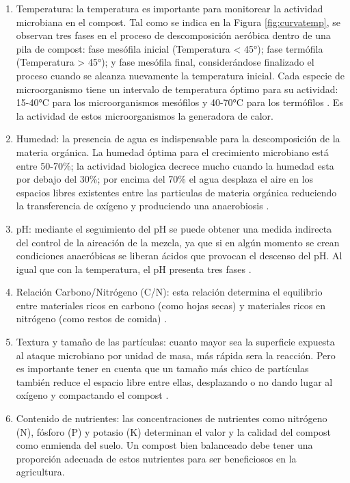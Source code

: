  \begin{enumerate}
	\item Temperatura: la temperatura es importante para monitorear la actividad microbiana en el compost. Tal como se indica en la Figura \ref{fig:curvatemp}\citep{curvaTemp}, se observan tres fases en el proceso de descomposición aeróbica dentro de una pila de compost: fase mesófila inicial (Temperatura < 45°); fase termófila (Temperatura > 45°); y fase mesófila final, considerándose finalizado el proceso cuando se alcanza nuevamente la temperatura inicial.
    Cada especie de microorganismo tiene un intervalo de temperatura óptimo para su actividad: 15-40°C para los microorganismos mesófilos y 40-70°C para los termófilos \citep{FactoresCompost}. Es la actividad de estos microorganismos la generadora de calor.
    \item Humedad: la presencia de agua es indispensable para la descomposición de la materia orgánica. La humedad óptima para el crecimiento microbiano está entre 50-70\%; la actividad biologica decrece mucho cuando la humedad esta por debajo del 30\%; por encima del 70\% el agua desplaza el aire en los espacios libres existentes entre las particulas de materia orgánica reduciendo la transferencia de oxígeno y produciendo una anaerobiosis \citep{Compost}.
    \item pH: mediante el seguimiento del pH se puede obtener una medida indirecta del control de la aireación de la mezcla, ya que si en algún momento se crean condiciones anaeróbicas se liberan ácidos que provocan el descenso del pH. Al igual que con la temperatura, el pH presenta tres fases \citep{FactoresCompost}.
    \item Relación Carbono/Nitrógeno (C/N): esta relación determina el equilibrio entre materiales ricos en carbono (como hojas secas) y materiales ricos en nitrógeno (como restos de comida) \citep{FactoresCompost}.
    \item Textura y tamaño de las partículas: cuanto mayor sea la superficie expuesta al ataque microbiano por unidad de masa, más rápida sera la reacción. Pero es importante tener en cuenta que un tamaño más chico de partículas también reduce  el espacio libre entre ellas, desplazando o no dando lugar al oxígeno y compactando el compost \citep{ManualBuenasPracticas}.
    \item Contenido de nutrientes: las concentraciones de nutrientes como nitrógeno (N), fósforo (P) y potasio (K) determinan el valor y la calidad del compost como enmienda del suelo. Un compost bien balanceado debe tener una proporción adecuada de estos nutrientes para ser beneficiosos en la agricultura. \citep{Risti}
 \end{enumerate}
 


